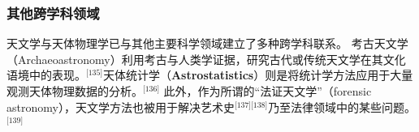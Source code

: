 \subsubsection{其他跨学科领域}
天文学与天体物理学已与其他主要科学领域建立了多种跨学科联系。  
考古天文学（Archaeoastronomy）利用考古与人类学证据，研究古代或传统天文学在其文化语境中的表现。\(^\text{[135]}\)天体统计学（\textbf{Astrostatistics}）则是将统计学方法应用于大量观测天体物理数据的分析。\(^\text{[136]}\) 此外，作为所谓的“法证天文学”（forensic astronomy），天文学方法也被用于解决艺术史\(^\text{[137][138]}\)乃至法律领域中的某些问题。\(^\text{[139]}\)
